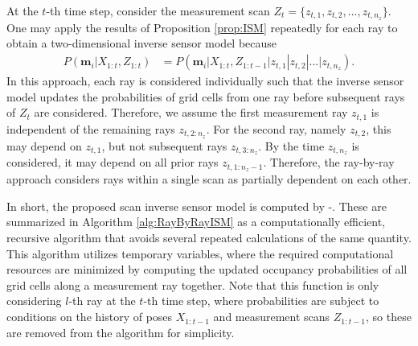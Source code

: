 At the $t$-th time step, consider the measurement scan $Z_t=\{z_{t,1},z_{t,2},...,z_{t,n_z}\}$. One may apply the results of Proposition \ref{prop:ISM} repeatedly for each ray to obtain a two-dimensional inverse sensor model because
\begin{align}
\label{eqn:RayByRayScanISM}
P(\mathbf{m}_i|X_{1:t},Z_{1:t})&%
=P(\mathbf{m}_i|X_{1:t},Z_{1:t-1}|z_{t,1}|z_{t,2}|...|z_{t,n_z}).
\end{align}
In this approach, each ray is considered individually such that the inverse sensor model updates the probabilities of grid cells from one ray before subsequent rays of $Z_t$ are considered. Therefore, we assume the first measurement ray $z_{t,1}$ is independent of the remaining rays $z_{t,2:n_z}$. For the second ray, namely $z_{t,2}$, this may depend on $z_{t,1}$, but not subsequent rays $z_{t,3:n_z}$. By the time $z_{t,n_z}$ is considered, it may depend on all prior rays $z_{t,1:n_z-1}$. Therefore, the ray-by-ray approach considers rays within a single scan as partially dependent on each other.

In short, the proposed scan inverse sensor model is computed by -. These are summarized in Algorithm \ref{alg:RayByRayISM} as a computationally efficient, recursive algorithm that avoids several repeated calculations of the same quantity. This algorithm utilizes temporary variables, where the required computational resources are minimized by computing the updated occupancy probabilities of all grid cells along a measurement ray together. Note that this function is only considering $l$-th ray at the $t$-th time step, where probabilities are subject to conditions on the history of poses $X_{1:t-1}$ and measurement scans $Z_{1:t-1}$, so these are removed from the algorithm for simplicity.

